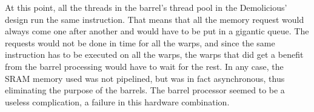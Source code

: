 \documentclass[../main/report.tex]{subfiles}
\begin{document}
At this point, all the threads in the barrel's thread pool in the Demolicious' design run the same instruction.
That means that all the memory request would always come one after another and would have to be put in a gigantic queue.
The requests would not be done in time for all the warps, and since the same instruction has to be executed on all the warps, the warps that did get a benefit from the barrel processing would have to wait for the rest.
In any case, the SRAM memory used was not pipelined, but was in fact asynchronous, thus eliminating the purpose of the barrels.
The barrel processor seemed to be a useless complication, a failure in this hardware combination.
\end{document}
